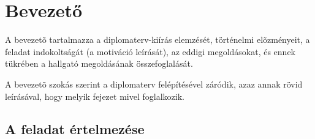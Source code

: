 \chapter*{Bevezető}

A bevezetõ tartalmazza a diplomaterv-kiírás elemzését, történelmi elõzményeit, a feladat
indokoltságát (a motiváció leírását), az eddigi megoldásokat, és ennek tükrében a hallgató
megoldásának összefoglalását.

A bevezetõ szokás szerint a diplomaterv felépítésével záródik, azaz annak rövid leírásával, hogy
melyik fejezet mivel foglalkozik.

\section{A feladat értelmezése}

